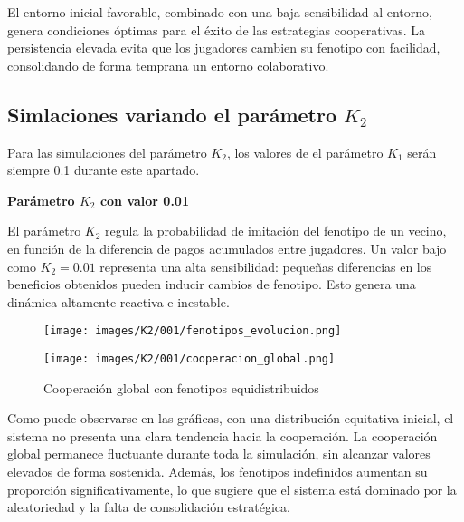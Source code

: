 \documentclass[a4paper,12pt]{report}
\begin{document}
El entorno inicial favorable, combinado con una baja sensibilidad al entorno, genera condiciones óptimas para el éxito de las estrategias cooperativas. La persistencia elevada evita que los jugadores cambien su fenotipo con facilidad, consolidando de forma temprana un entorno colaborativo.

\newpage

\subsection*{Simlaciones variando el parámetro \( K_2 \)}

Para las simulaciones del parámetro \( K_2 \), los valores de el parámetro \( K_1 \) serán siempre 0.1 durante este apartado.

\vspace{1.5em}
\noindent\textbf{Parámetro \( K_2 \) con valor 0.01}

El parámetro \( K_2 \) regula la probabilidad de imitación del fenotipo de un vecino, en función de la diferencia de pagos acumulados entre jugadores. Un valor bajo como \( K_2 = 0.01 \) representa una alta sensibilidad: pequeñas diferencias en los beneficios obtenidos pueden inducir cambios de fenotipo. Esto genera una dinámica altamente reactiva e inestable.


\begin{figure}[h!]
    \centering
    \begin{minipage}{0.49\textwidth}
    \centering
    \texttt{[image: images/K2/001/fenotipos\_evolucion.png]}
    \label{fig:enter-label}
    \end{minipage}
    \hfill
    \begin{minipage}{0.49\textwidth}
    \centering
    \texttt{[image: images/K2/001/cooperacion\_global.png]}
    \label{fig:enter-label}
    \end{minipage}
    \caption{Cooperación global con fenotipos equidistribuidos}
\end{figure}

Como puede observarse en las gráficas, con una distribución equitativa inicial, el sistema no presenta una clara tendencia hacia la cooperación. La cooperación global permanece fluctuante durante toda la simulación, sin alcanzar valores elevados de forma sostenida. Además, los fenotipos indefinidos aumentan su proporción significativamente, lo que sugiere que el sistema está dominado por la aleatoriedad y la falta de consolidación estratégica.
\end{document}
